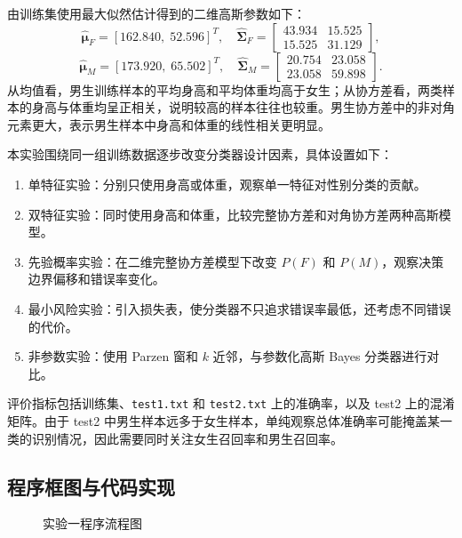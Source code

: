 \documentclass[UTF8,a4paper,12pt]{ctexart}
\begin{document}
由训练集使用最大似然估计得到的二维高斯参数如下：
\[
\hat{\boldsymbol{\mu}}_F = [162.840,\;52.596]^T,
\quad
\hat{\boldsymbol{\Sigma}}_F=
\begin{bmatrix}
43.934 & 15.525\\
15.525 & 31.129
\end{bmatrix},
\]
\[
\hat{\boldsymbol{\mu}}_M = [173.920,\;65.502]^T,
\quad
\hat{\boldsymbol{\Sigma}}_M=
\begin{bmatrix}
20.754 & 23.058\\
23.058 & 59.898
\end{bmatrix}.
\]
从均值看，男生训练样本的平均身高和平均体重均高于女生；从协方差看，两类样本的身高与体重均呈正相关，说明较高的样本往往也较重。男生协方差中的非对角元素更大，表示男生样本中身高和体重的线性相关更明显。

本实验围绕同一组训练数据逐步改变分类器设计因素，具体设置如下：
\begin{enumerate}
  \item 单特征实验：分别只使用身高或体重，观察单一特征对性别分类的贡献。
  \item 双特征实验：同时使用身高和体重，比较完整协方差和对角协方差两种高斯模型。
  \item 先验概率实验：在二维完整协方差模型下改变 $P(F)$ 和 $P(M)$，观察决策边界偏移和错误率变化。
  \item 最小风险实验：引入损失表，使分类器不只追求错误率最低，还考虑不同错误的代价。
  \item 非参数实验：使用 Parzen 窗和 $k$ 近邻，与参数化高斯 Bayes 分类器进行对比。
\end{enumerate}
评价指标包括训练集、\texttt{test1.txt} 和 \texttt{test2.txt} 上的准确率，以及 test2 上的混淆矩阵。由于 test2 中男生样本远多于女生样本，单纯观察总体准确率可能掩盖某一类的识别情况，因此需要同时关注女生召回率和男生召回率。

\subsection{程序框图与代码实现}

\begin{figure}[H]
\centering
{}
\caption{实验一程序流程图}
\label{fig:exp1_flow}
\end{figure}
\end{document}
